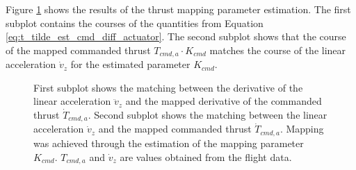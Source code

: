 \documentclass[11pt, a4paper, twoside]{report}
\begin{document}
Figure \ref{fig:thrust_mapping} shows the results of the thrust mapping parameter estimation. The first subplot contains the courses of the quantities from Equation \ref{eq:t_tilde_est_cmd_diff_actuator}. The second subplot shows that the course of the mapped commanded thrust $T_{cmd, a} \cdot K_{cmd}$ matches the course of the linear acceleration $\dot{v}_{z}$ for the estimated parameter $K_{cmd}$.
 
\begin{figure}[h]
	\centering 
	\captionsetup{justification=centering, singlelinecheck=off, font=bf, belowskip=-0.5cm}
	\caption[Estimation of the thrust mapping parameter]{First subplot shows the matching between the derivative of the linear acceleration $\ddot{v}_{z}$ and the mapped derivative of the commanded thrust $\dot{T}_{cmd, a}$. Second subplot shows the matching between the linear acceleration $\dot{v}_{z}$ and the mapped commanded thrust $\dot{T}_{cmd, a}$. Mapping was achieved through the estimation of the mapping parameter $K_{cmd}$. $T_{cmd, a}$ and $\dot{v}_{z}$ are values obtained from the flight data.}
	\label{fig:thrust_mapping}
\end{figure}

\end{document}
